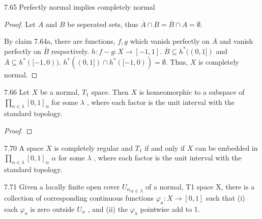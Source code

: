 \documentclass{article}
\newcommand*{\subeq}{\subseteq}
\newcommand*{\empset}{\emptyset}
\begin{document}
\bigskip

\begin{claim}{7.65}\label{Claim 7.65.}
    Perfectly normal implies completely normal
\end{claim}
\begin{proof}
    Let $A$ and $B$ be seperated sets, thus $\overline{A} \cap B = \overline{B} \cap A = \empset$. 
    
    By claim 7.64a, there are functions, $f, g$ which vanish perfectly on $\overline{A}$ and vanish perfectly on $\overline{B}$ respectively. $h: f - g: X \to [-1, 1]$. $\overline{B} \subeq h^*((0, 1])$ and $\overline{A} \subeq h^*([-1, 0))$. $h^*((0, 1]) \cap h^*([-1, 0)) = \empset$. Thus, $X$ is completely normal.       
\end{proof}

\bigskip

\begin{claim}{7.66}\label{Claim 7.66.}
    Let $X$ be a normal, $T_1$ space. Then $X$ is homeomorphic to a subspace of $\prod_{\alpha \in \lambda}[0, 1]_{\alpha}$  for some $\lambda$ , where each factor is the unit interval with the standard topology.
\end{claim}
\begin{proof}
\end{proof}

\bigskip

\begin{claim}{7.70}\label{Claim 7.70.}
    A space $X$ is completely regular and $T_1$ if and only if $X$  can be embedded in $\prod_{\alpha \in \lambda}[0, 1]_\alpha$ $\alpha$  for some $\lambda$ , where each factor is the unit interval with the standard topology.

\end{claim}

\bigskip

\begin{claim}{7.71}\label{Claim 7.71.}
    Given a locally finite open cover ${U_\alpha}_{\alpha \in \lambda}$ of a normal, T1 space X, there is a collection of corresponding continuous functions $\varphi_a: X \to [0, 1]$ such that (i) each $\varphi_a$  is zero outside $U_\alpha$ , and (ii) the $\varphi_a$  pointwise add to 1.
\end{claim}
\end{document}
